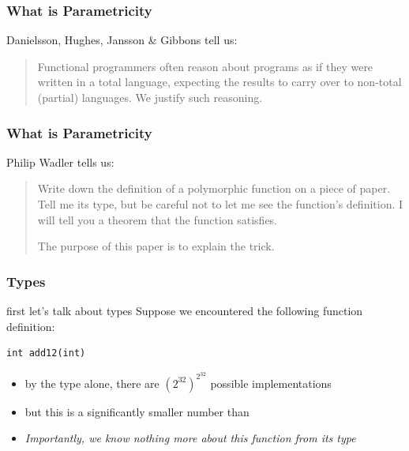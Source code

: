 \begin{frame}
\frametitle{What is Parametricity}
\begin{block}{Danielsson, Hughes, Jansson \& Gibbons \cite{danielsson2006fast} tell us:}
\begin{quotation}
Functional programmers often reason about programs as if
they were written in a total language, expecting the results
to carry over to non-total (partial) languages. We justify
such reasoning.
\end{quotation}
\end{block}
\end{frame}

\begin{frame}
\frametitle{What is Parametricity}
\begin{block}{Philip Wadler \cite{wadler1989theorems} tells us:}
\begin{quotation}
Write down the definition of a polymorphic function on a piece of paper. Tell me its type, but be careful not to let me see the function's definition. I will tell you a theorem that the function satisfies.

The purpose of this paper is to explain the trick.
\end{quotation}
\end{block}
\end{frame}

\begin{frame}[fragile]
\frametitle{Types}
\begin{block}{first let's talk about types}
Suppose we encountered the following function definition:
\begin{lstlisting}
int add12(int)
\end{lstlisting}
\end{block}
\begin{itemize}
  \item<1-> by the type alone, there are {$({2^{32}})^{2^{32}}$} possible implementations
  \item<2-> but this is a significantly smaller number than 
  \item<3-> \emph{Importantly, we know nothing more about this function from its type}
\end{itemize}
\end{frame}

